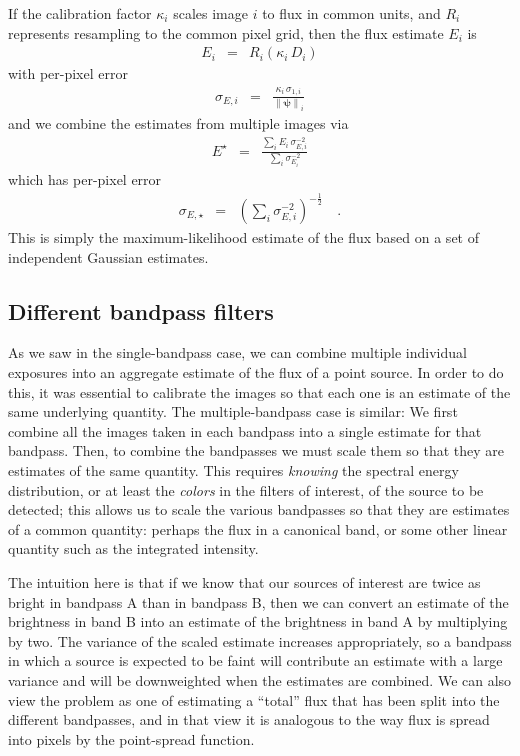\documentclass[letterpaper,preprint]{aastex}
\newcommand{\psf}{\psi}
\newcommand{\psfnorm}{\norm{\bm{\psf}}}
\newcommand{\norm}[1]{\left\lVert #1 \right\rVert}
\begin{document}
If the calibration factor $\kappa_i$ scales image $i$ to flux in
common units, and $R_i$ represents resampling to the common pixel grid,
then the flux estimate $E_i$ is
\begin{eqnarray}
E_i &=& R_i(\kappa_i \, D_i)
\end{eqnarray}
with per-pixel error
\begin{eqnarray}
\sigma_{E, i} &=& \frac{\kappa_i \, \sigma_{1,i}}{\psfnorm_i}
\end{eqnarray}
and we combine the estimates from multiple images via
\begin{eqnarray}
E^{\star} &=& \frac{\displaystyle\sum_i E_i \, \sigma^{-2}_{E,i}}{\displaystyle\sum_i \sigma^{-2}_{E_i}}
\label{eq:onebandmap}
\end{eqnarray}
which has per-pixel error
\begin{eqnarray}
\sigma_{E, \star} &=& \left( \sum_i \sigma^{-2}_{E,i} \right)^{-\frac{1}{2}}    \quad .
\end{eqnarray}
This is simply the maximum-likelihood estimate of the flux based on a
set of independent Gaussian estimates.


\subsection{Different bandpass filters}

As we saw in the single-bandpass case, we can combine multiple
individual exposures into an aggregate estimate of the flux of a point
source.  In order to do this, it was essential to calibrate the images
so that each one is an estimate of the same underlying quantity.  The
multiple-bandpass case is similar: We first combine all the images
taken in each bandpass into a single estimate for that bandpass.
Then, to combine the bandpasses we must scale them so that they are
estimates of the same quantity.  This requires \emph{knowing} the
spectral energy distribution, or at least the \emph{colors} in the
filters of interest, of the source to be detected; this allows us to
scale the various bandpasses so that they are estimates of a common
quantity: perhaps the flux in a canonical band, or some other linear
quantity such as the integrated intensity.



The intuition here is that if we know that our sources of interest are
twice as bright in bandpass A than in bandpass B, then we can convert
an estimate of the brightness in band B into an estimate of the
brightness in band A by multiplying by two.  The variance of the
scaled estimate increases appropriately, so a bandpass in which a
source is expected to be faint will contribute an estimate with a
large variance and will be downweighted when the estimates are
combined.  We can also view the problem as one of estimating a
``total'' flux that has been split into the different bandpasses, and
in that view it is analogous to the way flux is spread into pixels by
the point-spread function.
\end{document}
